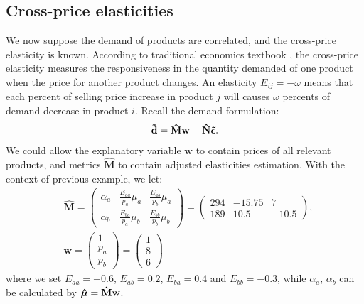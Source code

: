 \documentclass[a4paper,11pt]{article}
\begin{document}
\subsection{Cross-price elasticities} \label{sub:app2}

We now suppose the demand of products are correlated, and the cross-price elasticity is known. According to traditional economics textbook \cite{FC13}, the cross-price elasticity measures the responsiveness in the quantity demanded of one product when the price for another product changes. An elasticity $E_{ij} = -\omega$ means that each percent of selling price increase in product $j$ will causes $\omega$ percents of demand decrease in product $i$. Recall the demand formulation:
\[
\mathbf{\tilde{d}} =  \mathbf{\hat{M}} \mathbf{w}
+ \mathbf{\hat{N}} \mbox{\boldmath$\tilde{\epsilon}$}.
\]
We could allow the explanatory variable $\mathbf{w}$ to contain prices of all relevant products, and metrics $\mathbf{\hat{M}}$ to contain adjusted elasticities estimation. With the context of previous example, we let:
\[
\begin{aligned}
&\mathbf{\hat{M}} = 
\begin{pmatrix}
\alpha_a&\frac{E_{aa}}{p_a}\mu_a&\frac{E_{ab}}{p_b}\mu_a\\
\alpha_b&\frac{E_{ba}}{p_a}\mu_b&\frac{E_{bb}}{p_b}\mu_b
\end{pmatrix} =
\begin{pmatrix}
294&-15.75&7\\
189&10.5&-10.5
\end{pmatrix},\\
&\mathbf{w} = 
\begin{pmatrix}
1\\
p_a\\
p_b
\end{pmatrix} =
\begin{pmatrix}
1\\
8\\
6
\end{pmatrix}
\end{aligned}
\]
where we set $E_{aa} = -0.6$, $E_{ab} = 0.2$, $E_{ba} = 0.4$ and $E_{bb} = -0.3$, while $\alpha_a$, $\alpha_b$ can be calculated by $\mbox{\boldmath$\hat{\mu}$} = \mathbf{\hat{M}}\mathbf{w}$.
\end{document}
